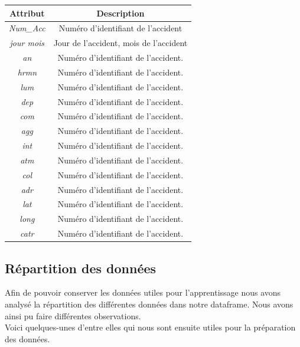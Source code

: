 \documentclass[]{article}
\begin{document}
    \begin{center}
        \begin{tabular}{ |c|c| }
            \hline
            \textbf{Attribut} & \textbf{Description} \\
            \hline
            \textit{Num\_Acc} & Numéro d'identifiant de l'accident \\
            \textit{jour mois} & Jour de l'accident, mois de l'accident \\
            \textit{an} & Numéro d'identifiant de l'accident. \\
            \textit{hrmn} & Numéro d'identifiant de l'accident. \\
            \textit{lum} & Numéro d'identifiant de l'accident. \\
            \textit{dep} & Numéro d'identifiant de l'accident. \\
            \textit{com} & Numéro d'identifiant de l'accident. \\
            \textit{agg} & Numéro d'identifiant de l'accident. \\
            \textit{int} & Numéro d'identifiant de l'accident. \\
            \textit{atm} & Numéro d'identifiant de l'accident. \\
            \textit{col} & Numéro d'identifiant de l'accident. \\
            \textit{adr} & Numéro d'identifiant de l'accident. \\
            \textit{lat} & Numéro d'identifiant de l'accident. \\
            \textit{long} & Numéro d'identifiant de l'accident. \\
            \textit{catr} & Numéro d'identifiant de l'accident. \\        
            \hline
        \end{tabular}
    \end{center}

    \subsection{Répartition des données}
    Afin de pouvoir conserver les données utiles pour l'apprentissage nous avons analysé la répartition des 
    différentes données dans notre dataframe.
    Nous avons ainsi pu faire différentes observations. 
    \\
    Voici quelques-unes d'entre elles qui nous sont ensuite
    utiles pour la préparation des données.
\end{document}
